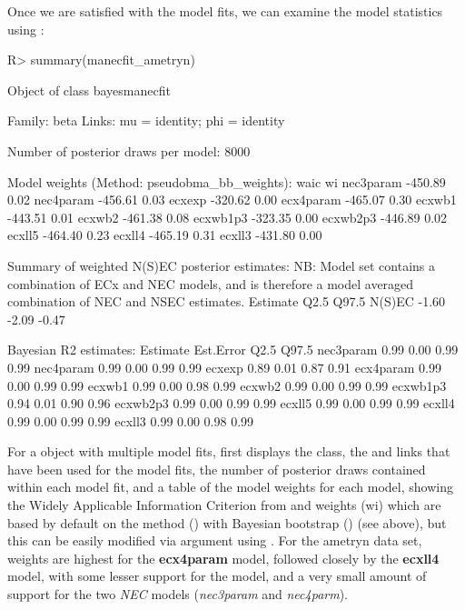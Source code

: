 \documentclass[
  shortnames]{jss}
\begin{document}
Once we are satisfied with the model fits, we can examine the model statistics using :

\newpage

\begin{CodeChunk}
\begin{CodeInput}
R> summary(manecfit_ametryn)
\end{CodeInput}
\begin{CodeOutput}
Object of class bayesmanecfit

 Family: beta  
  Links: mu = identity; phi = identity  

Number of posterior draws per model:  8000

Model weights (Method: pseudobma_bb_weights):
             waic   wi
nec3param -450.89 0.02
nec4param -456.61 0.03
ecxexp    -320.62 0.00
ecx4param -465.07 0.30
ecxwb1    -443.51 0.01
ecxwb2    -461.38 0.08
ecxwb1p3  -323.35 0.00
ecxwb2p3  -446.89 0.02
ecxll5    -464.40 0.23
ecxll4    -465.19 0.31
ecxll3    -431.80 0.00


Summary of weighted N(S)EC posterior estimates:
NB: Model set contains a combination of ECx and NEC
    models, and is therefore a model averaged
    combination of NEC and NSEC estimates.
       Estimate  Q2.5 Q97.5
N(S)EC    -1.60 -2.09 -0.47


Bayesian R2 estimates:
          Estimate Est.Error Q2.5 Q97.5
nec3param     0.99      0.00 0.99  0.99
nec4param     0.99      0.00 0.99  0.99
ecxexp        0.89      0.01 0.87  0.91
ecx4param     0.99      0.00 0.99  0.99
ecxwb1        0.99      0.00 0.98  0.99
ecxwb2        0.99      0.00 0.99  0.99
ecxwb1p3      0.94      0.01 0.90  0.96
ecxwb2p3      0.99      0.00 0.99  0.99
ecxll5        0.99      0.00 0.99  0.99
ecxll4        0.99      0.00 0.99  0.99
ecxll3        0.99      0.00 0.98  0.99
\end{CodeOutput}
\end{CodeChunk}

For a  object with multiple model fits,  first displays the class, the  and links that have been used for the model fits, the number of posterior draws contained within each model fit, and a table of the model weights for each model, showing the Widely Applicable Information Criterion \citep[waic,][]{watanabe2010asymptotic} from  and weights (wi) which are based by default on the  method () with Bayesian bootstrap () (see above), but this can be easily modified via argument  using . For the ametryn data set, weights are highest for the \textbf{ecx4param} model, followed closely by the \textbf{ecxll4} model, with some lesser support for the  model, and a very small amount of support for the two \emph{NEC} models (\emph{nec3param} and \emph{nec4parm}).
\end{document}
